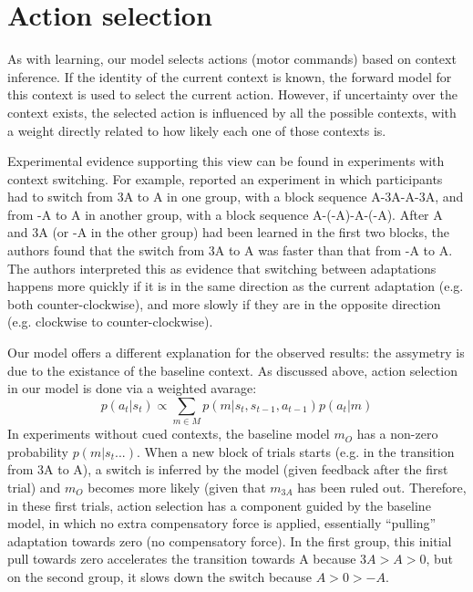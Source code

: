 \documentclass[a4paper,doc,floatsintext,natbib]{apa6}
\begin{document}
\section{Action selection}
As with learning, our model selects actions (motor commands) based on context inference. If the identity of the current context is known, the forward model for this context is used to select the current action. However, if uncertainty over the context exists, the selected action is influenced by all the possible contexts, with a weight directly related to how likely each one of those contexts is.

Experimental evidence supporting this view can be found in experiments with context switching. For example, \cite{Davidson_Scaling_2004} reported an experiment in which participants had to switch from 3A to A in one group, with a block sequence A-3A-A-3A, and from -A to A in another group, with a block sequence A-(-A)-A-(-A). After A and 3A (or -A in the other group) had been learned in the first two blocks, the authors found that the switch from 3A to A was faster than that from -A to A. The authors interpreted this as evidence that switching between adaptations happens more quickly if it is in the same direction as the current adaptation (e.g. both counter-clockwise), and more slowly if they are in the opposite direction (e.g. clockwise to counter-clockwise).

Our model offers a different explanation for the observed results: the assymetry is due to the existance of the baseline context. As discussed above, action selection in our model is done via a weighted avarage:
\begin{equation}
p(a_t | s_t) \propto \displaystyle \sum_{m \in M} p(m | s_t, s_{t-1}, a_{t-1}) p(a_t | m)
\end{equation}
In experiments without cued contexts, the baseline model $m_O$ has a non-zero probability $p(m | s_t ...)$. When a new block of trials starts (e.g. in the transition from 3A to A), a switch is inferred by the model (given feedback after the first trial) and $m_O$ becomes more likely (given that $m_{3A}$ has been ruled out. Therefore, in these first trials, action selection has a component guided by the baseline model, in which no extra compensatory force is applied, essentially ``pulling'' adaptation towards zero (no compensatory force). In the first group, this initial pull towards zero accelerates the transition towards A because $3A > A > 0$, but on the second group, it slows down the switch because $A > 0 > -A$.
\end{document}
